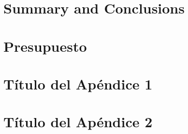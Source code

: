\documentclass[12pt,a4paper,oneside]{report}
\begin{document}


\newpage{\pagestyle{empty}}
\thispagestyle{empty}

\chapter{\LARGE Summary and Conclusions}
\label{chapter:conclusions}



\newpage{\pagestyle{empty}}
\thispagestyle{empty}

\chapter{\LARGE Presupuesto}
\label{chapter:presupuesto}


\newpage{\pagestyle{empty}\cleardoublepage}
\thispagestyle{empty}

\begin{appendix}

\chapter{\LARGE Título del Apéndice 1}
\label{appendix:1}


\chapter{\LARGE Título del Apéndice 2}
\label{appendix:2}


\end{appendix}




\end{document}

